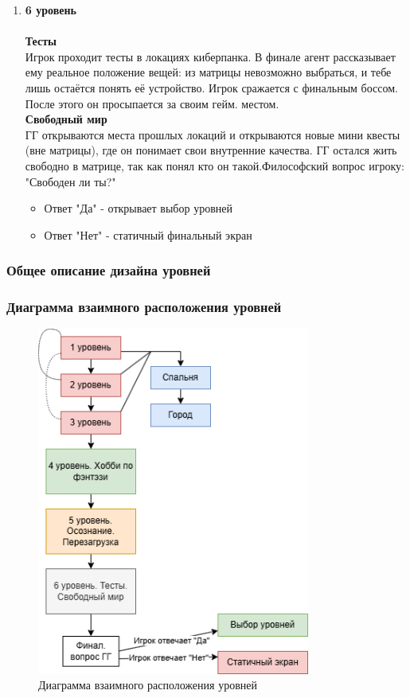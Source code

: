 \documentclass{article}
\begin{document}
\begin{enumerate}[label=\arabic*., leftmargin=*]
\item \textbf{6 уровень}\\
\\ \textbf{Тесты}\\
Игрок проходит тесты в локациях киберпанка. В финале агент рассказывает ему реальное положение вещей: из матрицы невозможно выбраться, и тебе лишь остаётся понять её устройство. Игрок сражается с финальным боссом. После этого он просыпается за своим гейм. местом.
\\ \textbf{Свободный мир}\\
ГГ открываются места прошлых локаций и открываются новые мини квесты (вне матрицы), где он понимает свои внутренние качества. ГГ остался жить свободно в матрице, так как понял кто он такой.Философский вопрос игроку: "Свободен ли ты?"
        \begin{itemize}
            \item Ответ "Да" - открывает выбор уровней
            \item Ответ "Нет" - статичный финальный экран
        \end{itemize}
\end{enumerate}

\subsubsection{Общее описание дизайна уровней}

\subsubsection{Диаграмма взаимного расположения уровней}
\begin{figure}[htbp]
\centering
\includegraphics[width=0.8\textwidth]{Диаграмма взаимосвязей уровней} %
\caption{Диаграмма взаимного расположения уровней}
\label{fig:my_image}
\end{figure}
\end{document}

